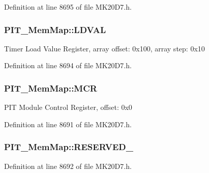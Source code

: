 Definition at line 8695 of file M\+K20\+D7.\+h.

\subsubsection[{\texorpdfstring{L\+D\+V\+AL}{LDVAL}}]{ P\+I\+T\+\_\+\+Mem\+Map\+::\+L\+D\+V\+AL}\hypertarget{struct_p_i_t___mem_map_ad664bbe0f8b53ee1e533727db4da3fb2}{}\label{struct_p_i_t___mem_map_ad664bbe0f8b53ee1e533727db4da3fb2}
Timer Load Value Register, array offset\+: 0x100, array step\+: 0x10 

Definition at line 8694 of file M\+K20\+D7.\+h.

\subsubsection[{\texorpdfstring{M\+CR}{MCR}}]{ P\+I\+T\+\_\+\+Mem\+Map\+::\+M\+CR}\hypertarget{struct_p_i_t___mem_map_a99390c5764693e07c37d40ead441a7a4}{}\label{struct_p_i_t___mem_map_a99390c5764693e07c37d40ead441a7a4}
P\+IT Module Control Register, offset\+: 0x0 

Definition at line 8691 of file M\+K20\+D7.\+h.

\subsubsection[{\texorpdfstring{R\+E\+S\+E\+R\+V\+E\+D\+\_\+0}{RESERVED_0}}]{ P\+I\+T\+\_\+\+Mem\+Map\+::\+R\+E\+S\+E\+R\+V\+E\+D\+\_}\hypertarget{struct_p_i_t___mem_map_ae4fc0749ddebd75252cc2b7b1dab3b91}{}\label{struct_p_i_t___mem_map_ae4fc0749ddebd75252cc2b7b1dab3b91}


Definition at line 8692 of file M\+K20\+D7.\+h.

